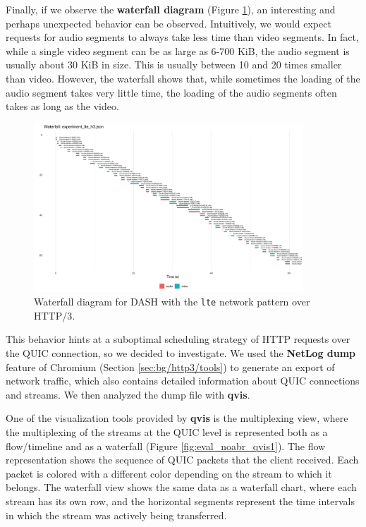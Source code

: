 Finally, if we observe the \textbf{waterfall diagram} (Figure \ref{fig:eval_nonabr_lte_h3_waterfall}), an interesting and perhaps unexpected behavior can be observed. Intuitively, we would expect requests for audio segments to always take less time than video segments. In fact, while a single video segment can be as large as 6-700 KiB, the audio segment is usually about 30 KiB in size. This is usually between 10 and 20 times smaller than video. However, the waterfall shows that, while sometimes the loading of the audio segment takes very little time, the loading of the audio segments often takes as long as the video.

\begin{figure}[h]
    \centering
    \includegraphics[width=0.9\textwidth]{res/eval_nonabr_lte_h3_waterfall.png}
    \caption{Waterfall diagram for DASH with the \texttt{lte} network pattern over HTTP/3.}
    \label{fig:eval_nonabr_lte_h3_waterfall}
\end{figure}

This behavior hints at a suboptimal scheduling strategy of HTTP requests over the QUIC connection, so we decided to investigate. We used the \textbf{NetLog dump} feature of Chromium (Section \ref{sec:bg/http3/tools}) to generate an export of network traffic, which also contains detailed information about QUIC connections and streams. We then analyzed the dump file with \textbf{qvis}.

One of the visualization tools provided by \textbf{qvis} is the multiplexing view, where the multiplexing of the streams at the QUIC level is represented both as a flow/timeline and as a waterfall (Figure \ref{fig:eval_noabr_qvis1}). The flow representation shows the sequence of QUIC packets that the client received. Each packet is colored with a different color depending on the stream to which it belongs. The waterfall view shows the same data as a waterfall chart, where each stream has its own row, and the horizontal segments represent the time intervals in which the stream was actively being transferred.

